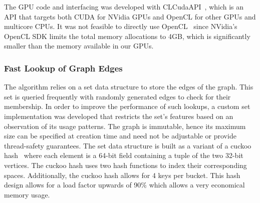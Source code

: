 \begin{comment}
\textit{\bf !!! Remove the history approach !!!}
Initially, the system was developed using OpenCL~\cite{opencl} in order to
accelerate the computations of the algorithm. OpenCL was chosen as it provides
a common abstraction for a variety of compute devices.
However, NVidia's OpenCL SDK limits the
total memory allocations within a context to 4GB which severely limits the
problem sizes that can be tackled on GPUs. Therefore, we migrated the system to
use the abstraction layer CLCudaAPI~\cite{claduc}
to support both OpenCL and CUDA~\cite{Nickolls:2008:SPP:1365490.1365500}
as back-ends.
%
CLCudaAPI
hides the difference between OpenCL and the CUDA driver API.
For example, the library provides abstractions for Device, Context, Queue and
Buffer. Additionally, the implementations use a combination of inline functions
and preprocessor macros to abstract away the differences between OpenCL's and
CUDA's primitive types, address spaces and functions.
\end{comment}
The GPU code and interfacing was developed with CLCudaAPI~\cite{claduc}, which
is an API that targets both CUDA for NVidia GPUs and OpenCL for other GPUs and
multicore CPUs. It was not feasible to directly use OpenCL~\cite{opencl} since
NVidia's OpenCL SDK limits the total memory allocations to 4GB, which is
significantly smaller than the memory available in our GPUs.

\subsubsection{Fast Lookup of Graph Edges}

The algorithm relies on a set data structure to store the edges of the graph.
This set is queried frequently with randomly generated edges to check for their
membership. In order to improve the performance of such lookups, a custom set
implementation was developed that restricts the set's features based on an
observation of its usage patterns.
The graph is immutable, hence its maximum
size can be specified at creation time and need not be adjustable or provide
thread-safety guarantees. The set data
structure is built as a variant of a cuckoo
hash~\cite{Pagh:2004:CH:1006424.1006426} where each element is a 64-bit
field containing a tuple of the two 32-bit vertices. The cuckoo hash
uses two hash functions to index their corresponding spaces. Additionally, the
cuckoo hash allows for 4 keys per bucket. This hash design allows for a load
factor upwards of 90\% which allows a very economical memory usage.

